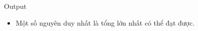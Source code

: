 Output
\begin{itemize}
	\item     Một số nguyên duy nhất là tổng lớn nhất có thể đạt được.   
\end{itemize}